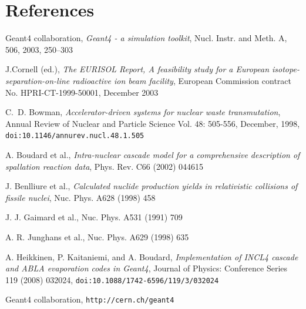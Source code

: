 \documentclass[a4paper]{jpconf}
\begin{document}



\section*{References}


\begin{thebibliography}{9}
 Geant4 collaboration, 
\emph{Geant4 - a simulation toolkit}, Nucl. Instr. and Meth. A, 506, 2003, 250--303

J.Cornell (ed.), \emph{The EURISOL Report, A feasibility study for a
European isotope-separation-on-line radioactive ion beam facility},
European Commission contract No. HPRI-CT-1999-50001, December 2003

C.~D. Bowman, \emph{Accelerator-driven systems for nuclear waste transmutation},
Annual Review of Nuclear and Particle Science Vol. 48: 505-556, December, 1998,
{\tt doi:10.1146/annurev.nucl.48.1.505}

 A. Boudard et al., \emph{Intra-nuclear cascade model for
    a comprehensive description of spallation reaction data}, Phys.
  Rev. C66 (2002) 044615

 J. Benlliure et al., \emph{Calculated nuclide
    production yields in relativistic collisions of fissile nuclei},
  Nuc. Phys. A628 (1998) 458

 J. J. Gaimard et al., %
  Nuc. Phys. A531 (1991) 709

 A. R. Junghans et al., %
  Nuc. Phys. A629 (1998) 635

 A. Heikkinen, P. Kaitaniemi, and A. Boudard,
\emph{Implementation of INCL4 cascade and ABLA evaporation codes in Geant4},
Journal of Physics: Conference Series 119 (2008) 032024, {\tt doi:10.1088\-/1742-6596\-/119/3/032024}

 Geant4 collaboration, {\tt http://\-cern.ch/\-geant4}


\end{thebibliography}
\end{document}
